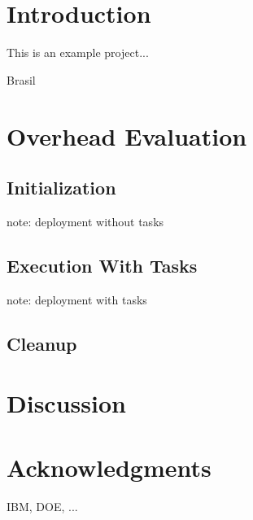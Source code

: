 \documentclass{article}
\begin{document}
\maketitle

\section*{Introduction}
This is an example project...

Brasil\cite{Brasil:2011}

\section*{Overhead Evaluation}
\subsection*{Initialization}
note: deployment without tasks
\subsection*{Execution With Tasks}
note: deployment with tasks
\subsection*{Cleanup}

\section*{Discussion}

\section*{Acknowledgments}

IBM, DOE, ...



\Action[]{}

\GTDBib[plain]


\listActions
\listPurchases
\listContacts
\listProjects

\GTDoutput
\end{document}
